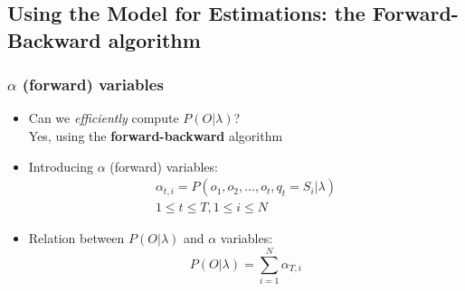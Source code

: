 \subsection[Forward-Backward algorithm]{Using the Model for
  Estimations: the Forward-Backward algorithm}
\label{sec:fb}

\begin{frame}
  \frametitle{$\alpha$ (forward) variables}
  \begin{itemize}
  \item Can we \emph{efficiently} compute $P(O \vert \lambda)$?\\
    \vspace*{.5em} Yes, using the \textbf{forward-backward} algorithm
    \vspace*{1em} \pause
  \item Introducing $\alpha$ (forward) variables:
    \begin{equation}
      \label{eq:alpha}
      \begin{split}
        \alpha_{t,i}=P(o_1,o_2,\ldots,o_t, q_t = S_i \vert \lambda) \\
        \scriptstyle{1 \le t \le T, 1 \le i \le N}
      \end{split}
    \end{equation}
    \pause
  \item Relation between $P(O \vert \lambda)$ and $\alpha$ variables:
    \begin{equation}
      \label{eq:eq1toalpha}
      P(O \vert \lambda) = \displaystyle\sum_{i=1}^{N}\alpha_{T,i}
    \end{equation}
  \end{itemize}
\end{frame}


